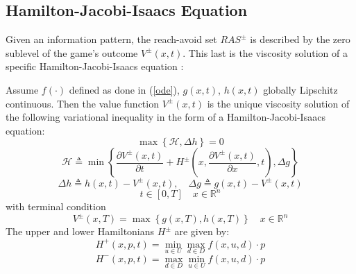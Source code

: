 \subsection{Hamilton-Jacobi-Isaacs Equation}
Given an information pattern, the reach-avoid set $RAS^\pm$ is described by the zero sublevel of the game's outcome $V^\pm(x,t)$. This last is the viscosity solution of a specific Hamilton-Jacobi-Isaacs equation \cite{new_paper}:
\begin{theorem}
    Assume $f(\cdot)$ defined as done in (\ref{ode}), $g(x,t)$, $h(x,t)$ globally Lipschitz continuous. Then the value function $V^\pm(x,t)$ is the unique viscosity solution of the following variational inequality in the form of a Hamilton-Jacobi-Isaacs equation:
    \[
        \max
        \left\{
            \mathcal{H}, \Delta h
        \right\} = 0
    \]
    \[
        \mathcal{H} \triangleq \min
        \left\{
            \frac{\partial V^\pm(x,t)}{\partial t} + 
            H^\pm\left(x, \frac{\partial V^\pm(x,t)}{\partial x}, t\right), \Delta g
        \right\} 
    \]
    \[
        \Delta h \triangleq h(x,t) - V^\pm(x,t), \quad \Delta g \triangleq g(x,t) - V^\pm(x,t)
    \]
    \[
        t \in [0, T] \quad x \in \mathbb{R}^n
    \]
    with terminal condition
    \[
        V^\pm(x,T) = \max \left\{ g(x,T), h(x,T) \right\} \quad x \in \mathbb{R}^n
    \]
    The upper and lower Hamiltonians $H^\pm$ are given by:
    \[
        H^+(x,p,t) = \min_{u \in U}\max_{d \in D} f(x, u, d)\cdot p
    \]    
    \[
        H^-(x,p,t) = \max_{d \in D}\min_{u \in U} f(x, u, d)\cdot p
    \]
\end{theorem}

